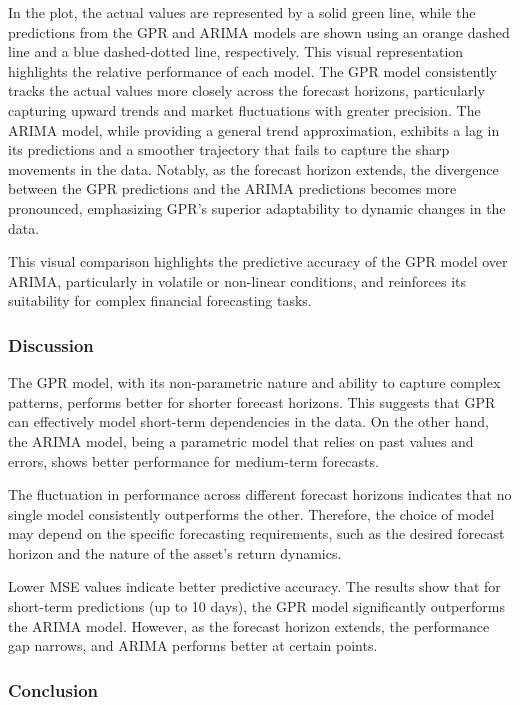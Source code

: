 \noindent In the plot, the actual values are represented by a solid green line, while the predictions from the GPR and ARIMA models are shown using an orange dashed line and a blue dashed-dotted line, respectively. This visual representation highlights the relative performance of each model.
The \ac{GPR} model consistently tracks the actual values more closely across the forecast horizons, particularly capturing upward trends and market fluctuations with greater precision. The ARIMA model, while providing a general trend approximation, exhibits a lag in its predictions and a smoother trajectory that fails to capture the sharp movements in the data. Notably, as the forecast horizon extends, the divergence between the GPR predictions and the ARIMA predictions becomes more pronounced, emphasizing GPR’s superior adaptability to dynamic changes in the data.

This visual comparison highlights the predictive accuracy of the GPR model over ARIMA, particularly in volatile or non-linear conditions, and reinforces its suitability for complex financial forecasting tasks.
\subsubsection{Discussion}

The GPR model, with its non-parametric nature and ability to capture complex patterns, performs better for shorter forecast horizons. This suggests that GPR can effectively model short-term dependencies in the data. On the other hand, the ARIMA model, being a parametric model that relies on past values and errors, shows better performance for medium-term forecasts.

The fluctuation in performance across different forecast horizons indicates that no single model consistently outperforms the other. Therefore, the choice of model may depend on the specific forecasting requirements, such as the desired forecast horizon and the nature of the asset's return dynamics.

Lower MSE values indicate better predictive accuracy. The results show that for short-term predictions (up to 10 days), the GPR model significantly outperforms the ARIMA model. However, as the forecast horizon extends, the performance gap narrows, and ARIMA performs better at certain points.

\subsubsection{Conclusion}


